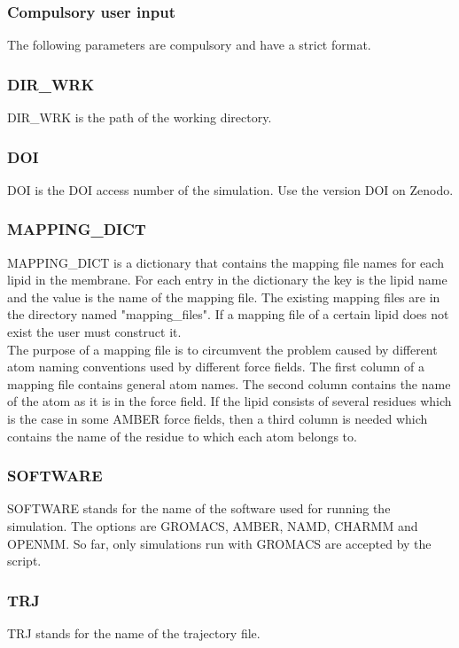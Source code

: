 \documentclass[fleqn,10pt]{wlscirep}
\begin{document}
\subsubsection{Compulsory user input}
The following parameters are compulsory and have a strict format.

\subsubsection*{DIR\_WRK}
DIR\_WRK is the path of the working directory.

\subsubsection*{DOI}
DOI is the DOI access number of the simulation. Use the version DOI on Zenodo.

\subsubsection*{MAPPING\_DICT}
MAPPING\_DICT is a dictionary that contains the mapping file names for each lipid in the membrane. For each entry in the dictionary the key is the lipid name and the value is the name of the mapping file. The existing mapping files are in the directory named "mapping\_files". If a mapping file of a certain lipid does not exist the user must construct it.
\newline \\
The purpose of a mapping file is to circumvent the problem caused by different atom naming conventions used by different force fields. The first column of a mapping file contains general atom names. The second column contains the name of the atom as it is in the force field. If the lipid consists of several residues which is the case in some AMBER force fields, then a third column is needed which contains the name of the residue to which each atom belongs to.

\subsubsection*{SOFTWARE}
SOFTWARE stands for the name of the software used for running the simulation. The options are GROMACS, AMBER, NAMD, CHARMM and OPENMM. So far, only simulations run with GROMACS are accepted by the script.

\subsubsection*{TRJ}
TRJ stands for the name of the trajectory file.
\end{document}
